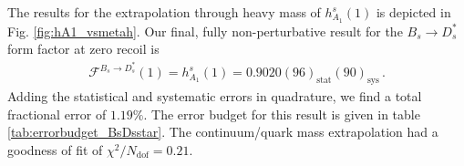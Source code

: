 
The results for the extrapolation through heavy mass of $h_{A_1}^s(1)$ is depicted in Fig. \ref{fig:hA1_vsmetah}. Our final, fully non-perturbative result for the $B_s\to D_s^*$ form factor at zero recoil is
\begin{align}
  \mathcal{F}^{B_s\to D_s^*}(1) = h^s_{A_1}(1) = 0.9020(96)_{\text{stat}}(90)_{\text{sys}}\,.
  \label{eq:finalresult}
\end{align}
Adding the statistical and systematic errors in quadrature, we find a total fractional error of $1.19\%$. The error budget for this result is given in table \ref{tab:errorbudget_BsDsstar}. The continuum/quark mass extrapolation had a goodness of fit of $\chi^2/N_{\text{dof}} = 0.21$.

